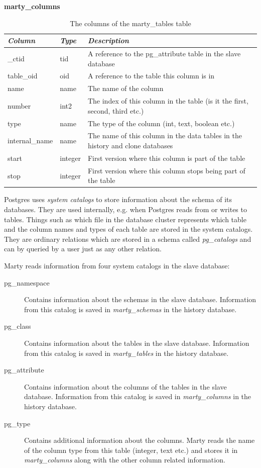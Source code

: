 \begin{table}[h]
  \centering
  \textbf{marty\_columns}
  \begin{tabularx}{\textwidth}{llX}
    \textit{Column} & \textit{Type} & \textit{Description} \\
    \midrule
    \_ctid & tid & A reference to the pg\_attribute table in the slave database \\
    table\_oid & oid & A reference to the table this column is in \\
    name & name & The name of the column \\
    number & int2 & The index of this column in the table (is it the first, second, third etc.) \\
    type & name & The type of the column (int, text, boolean etc.) \\
    internal\_name & name & The name of this column in the data tables in the history and clone databases \\
    start & integer & First version where this column is part of the table \\
    stop & integer & First version where this column stops being part of the table \\
  \end{tabularx}
  \caption{The columns of the marty\_tables table}
  \label{table:marty-columns}
\end{table}

Postgres uses \textit{system catalogs} to store information about the schema of its databases.
They are used internally, e.g. when Postgres reads from or writes to tables.
Things such as which file in the database cluster represents which table and the column names and types of each table are stored in the system catalogs. %
They are ordinary relations which are stored in a schema called \textit{pg\_catalogs} and can by queried by a user just as any other relation.

Marty reads information from four system catalogs in the slave database:

\begin{description}
  \item[pg\_namespace]
    Contains information about the schemas in the slave database.
    Information from this catalog is saved in \textit{marty\_schemas} in the history database. %
  \item[pg\_class]
    Contains information about the tables in the slave database.
    Information from this catalog is saved in \textit{marty\_tables} in the history database.
  \item[pg\_attribute]
    Contains information about the columns of the tables in the slave database.
    Information from this catalog is saved in \textit{marty\_columns} in the history database.
  \item[pg\_type]
    Contains additional information about the columns.
    Marty reads the name of the column type from this table (integer, text etc.) and stores it in \textit{marty\_columns} along with the other column related information.
\end{description}


